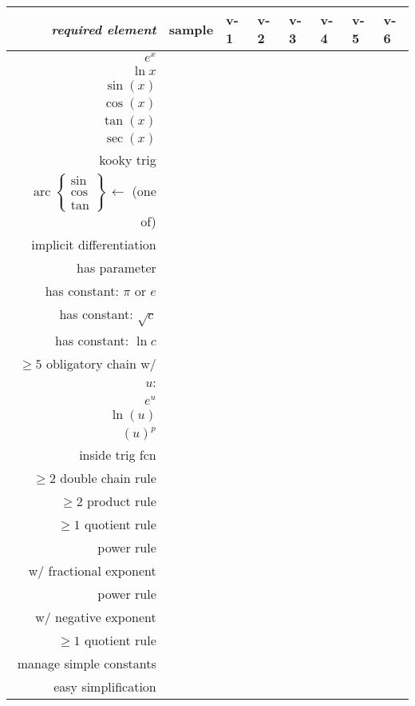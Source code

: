 \documentclass[12pt]{article}
\begin{document}
\phantom{foo}
\vspace{0.5in}

\begin{tabular}{r|l|l|l|l|l|l|l|}
\textsl{required element}   & sample & v-1 \phantom{xx} & v-2 \phantom{xx} & v-3 \phantom{xx} & v-4 \phantom{xx} & v-5 \phantom{xx} & v-6 \phantom{xx} \\ \hline
$e^x$                       & & & & & & & \\ \hline
$\ln x$                     & & & & & & & \\ \hline
$\sin(x)$                   & & & & & & & \\ \hline
$\cos(x)$                   & & & & & & & \\ \hline
$\tan(x)$                   & & & & & & & \\ \hline
$\sec(x)$                   & & & & & & & \\ \hline
kooky trig & & & & & & & \\ \hline

$\operatorname{arc}\left\{\begin{matrix} \sin \\ \cos \\ \tan \end{matrix}\right\} \,\leftarrow$ (one of)
                            & & & & & & & \\ \hline
implicit differentiation    & & & & & & & \\ \hline
has parameter               & & & & & & & \\ \hline
has constant: $\pi$ or $e$  & & & & & & & \\ \hline
has constant: $\sqrt{c}$    & & & & & & & \\ \hline
has constant: $\ln c$       & & & & & & & \\ \hline
$\ge 5$ obligatory chain w/ $u$:   & & & & & & & \\ 
  $e^u$ & & & & & & & \\
  $\ln(u)$ & & & & & & & \\
  $(u)^p$  & & & & & & & \\
  inside trig fcn& & & & & & & \\ \hline
$\ge 2$ double chain rule           & & & & & & & \\ \hline
$\ge 2$ product rule        & & & & & & & \\ \hline
$\ge 1$ quotient rule       & & & & & & & \\ \hline
power rule  & & & & & & & \\
w/ fractional exponent      & & & & & & & \\ \hline
power rule  & & & & & & & \\
w/ negative exponent        & & & & & & & \\ \hline
$\ge 1$ quotient rule       & & & & & & & \\ \hline
manage simple constants       & & & & & & & \\ \hline
easy simplification       & & & & & & & \\ \hline

\end{tabular}
\end{document}
